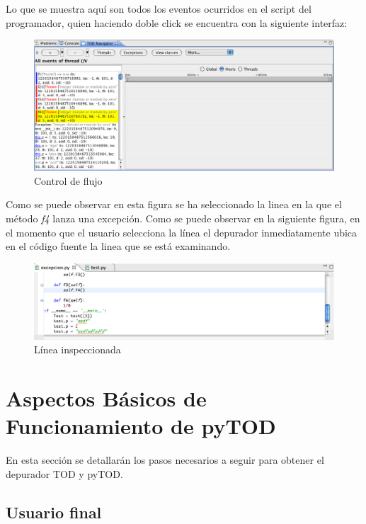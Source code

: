 \documentclass[12pt,legalpaper]{report}
\begin{document}
Lo que se muestra aquí son todos los eventos ocurridos en el script del programador, quien haciendo doble click se encuentra con la siguiente interfaz:

\begin{figure}[h]
	\centering
	\includegraphics[scale=0.4]{images/interfacesPlugin/depuracionTOD-3.eps}
	\caption{Control de flujo}
\end{figure}

Como se puede observar en esta figura se ha seleccionado la linea en la que el método \textit{f4} lanza una excepción.  Como se puede observar en la siguiente figura, en el momento que el usuario selecciona la línea el depurador inmediatamente ubica en el código fuente la linea que se está examinando.

 \begin{figure}[h]
	\centering
	\includegraphics[scale=0.4]{images/interfacesPlugin/depuracionTOD-4.eps}
	\caption{Línea inspeccionada}
\end{figure}

	\section{Aspectos Básicos de Funcionamiento de pyTOD}
	
En esta sección se detallarán los pasos necesarios a seguir para obtener el depurador TOD y pyTOD.	
		\subsection{Usuario final}
		
\end{document}
